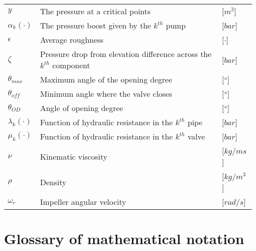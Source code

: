 \begin{tabular}{l l l}
	$y$					&	The pressure at a critical points							& [$m^3$]\\	
	$\alpha_k(\cdot)$	&	The pressure boost given by the	$k^{th}$ pump				& [$bar$]\\
	$\epsilon$			&	Average roughness									     	& [$\cdot$]\\
	$\zeta$				&	Pressure drop from elevation difference across the $k^{th}$ component	& [$bar$]\\
	$\theta_{max}$		&	Maximum angle of the opening degree						    & [$\degree$]\\
	$\theta_{off}$		&	Minimum angle where the valve closes						& [$\degree$]\\
	$\theta_{OD}$		&	Angle of opening degree										& [$\degree$]\\
	$\lambda_k(\cdot)$	&	Function of hydraulic resistance in the $k^{th}$ pipe		& [$bar$]\\
	$\mu_k(\cdot)$		&	Function of hydraulic resistance in the $k^{th}$ valve		& [$bar$]\\
	$\nu$				&	Kinematic viscosity									     	& [$kg/ms$]\\
	$\rho$				&	Density									     				& [$kg/m^3$]\\
	$\omega_r$			&	Impeller angular velocity									& [$rad/s$]\\
	
\end{tabular}


\newpage
\section*{Glossary of mathematical notation}


